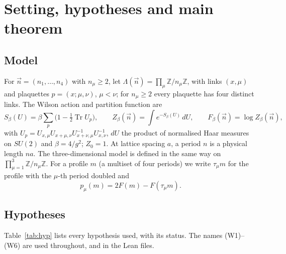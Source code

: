 \documentclass[11pt,a4paper]{article}
\theoremstyle{plain}
\theoremstyle{definition}
\theoremstyle{remark}
\numberwithin{equation}{section}
\newcommand{\Z}{\mathbb{Z}}
\newcommand{\Tr}{\operatorname{Tr}}
\begin{document}
\section{Setting, hypotheses and main theorem}\label{sec:setting}

\subsection{Model}
For $\vec n=(n_1,\dots,n_4)$ with $n_\mu\ge2$, let $\Lambda(\vec n)=\prod_\mu\Z/n_\mu\Z$, with links $(x,\mu)$ and plaquettes
$p=(x;\mu,\nu)$, $\mu<\nu$; for $n_\mu\ge2$ every plaquette has four distinct links. The Wilson action and partition function are
\begin{equation}\label{eq:wilson}
S_\beta(U)=\beta\sum_p\bigl(1-\tfrac12\Tr U_p\bigr),\qquad Z_\beta(\vec n)=\int e^{-S_\beta(U)}\,dU,\qquad F_\beta(\vec n)=\log Z_\beta(\vec n),
\end{equation}
with $U_p=U_{x,\mu}U_{x+\mu,\nu}U_{x+\nu,\mu}^{-1}U_{x,\nu}^{-1}$, $dU$ the product of normalised Haar measures on $SU(2)$ and
$\beta=4/g^2$; $Z_0=1$. At lattice spacing $a$, a period $n$ is a physical length $na$. The three-dimensional model is defined in the
same way on $\prod_{\mu=1}^3\Z/n_\mu\Z$. For a profile $m$ (a multiset of four periods) we write $\tau_\mu m$ for the profile with the
$\mu$-th period doubled and
\begin{equation}\label{eq:p}
p_\mu(m)=2F(m)-F(\tau_\mu m).
\end{equation}

\subsection{Hypotheses}\label{sec:hyp}
Table~\ref{tab:hyp} lists every hypothesis used, with its status. The names (W1)--(W6) are used throughout, and in the Lean files.
\end{document}
